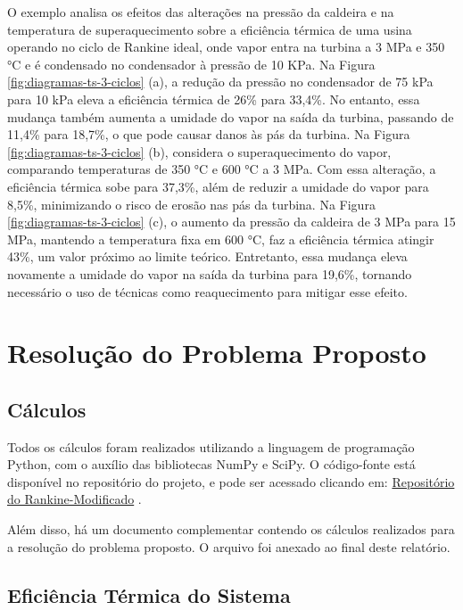 \documentclass[
	article,			%
	11pt,				%
	oneside,			%
	a4paper,			%
	english,			%
	brazil,				%
	sumario=tradicional
	]{abntex2}
\begin{document}
O exemplo analisa os efeitos das alterações na pressão da caldeira e na temperatura de superaquecimento sobre a eficiência térmica de uma usina operando no ciclo de Rankine ideal, onde vapor entra na turbina a 3 MPa e 350 °C e é condensado no condensador à pressão de 10 KPa.
Na Figura \ref{fig:diagramas-ts-3-ciclos} (a), a redução da pressão no condensador de 75 kPa para 10 kPa eleva a eficiência térmica de 26\% para 33,4\%. No entanto, essa mudança também aumenta a umidade do vapor na saída da turbina, passando de 11,4\% para 18,7\%, o que pode causar danos às pás da turbina.
Na Figura \ref{fig:diagramas-ts-3-ciclos} (b), considera o superaquecimento do vapor, comparando temperaturas de 350 °C e 600 °C a 3 MPa. Com essa alteração, a eficiência térmica sobe para 37,3\%, além de reduzir a umidade do vapor para 8,5\%, minimizando o risco de erosão nas pás da turbina.
Na Figura \ref{fig:diagramas-ts-3-ciclos} (c), o aumento da pressão da caldeira de 3 MPa para 15 MPa, mantendo a temperatura fixa em 600 °C, faz a eficiência térmica atingir 43\%, um valor próximo ao limite teórico. Entretanto, essa mudança eleva novamente a umidade do vapor na saída da turbina para 19,6\%, tornando necessário o uso de técnicas como reaquecimento para mitigar esse efeito.

\section{Resolução do Problema Proposto}

\subsection{Cálculos}
\label{sec:calculos}

Todos os cálculos foram realizados utilizando a linguagem de programação Python, com o auxílio das bibliotecas NumPy e SciPy. O código-fonte está disponível no repositório do projeto, e pode ser acessado clicando em: \href{https://github.com/joaoalexarruda/rankine-cycle/blob/main/calculos/Rankine-Modificado.ipynb}{Repositório do Rankine-Modificado}
\cite{Arruda_Rankine_2025}.

Além disso, há um documento complementar contendo os cálculos realizados para a resolução do problema proposto. O arquivo foi anexado ao final deste relatório.

\subsection{Eficiência Térmica do Sistema}
\end{document}
